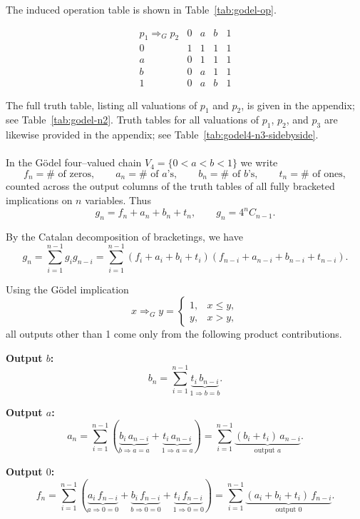 \documentclass[11pt]{article}
\begin{document}
\medskip
The induced operation table is shown in Table~\ref{tab:godel-op}.

\begin{table}[h]
\centering
\[
\begin{array}{c|cccc}
p_1 \Rightarrow_G p_2 & 0 & a & b & 1\\
\hline
0 & 1 & 1 & 1 & 1\\
a & 0 & 1 & 1 & 1\\
b & 0 & a & 1 & 1\\
1 & 0 & a & b & 1
\end{array}
\]
\caption{Gödel implication on \(V_4=\{0<a<b<1\}\).}
\label{tab:godel-op}
\end{table}

The full truth table, listing all valuations of \(p_1\) and \(p_2\), is given in the appendix;
see Table~\ref{tab:godel-n2}. Truth tables for all valuations of \(p_1\), \(p_2\), and \(p_3\)
are likewise provided in the appendix; see Table~\ref{tab:godel4-n3-sidebyside}.
\\\\
In the Gödel four--valued chain \(V_4=\{0<a<b<1\}\) we write
\[
f_n=\#\text{ of zeros},\qquad a_n=\#\text{ of \(a\)'s},\qquad b_n=\#\text{ of \(b\)'s},\qquad
t_n=\#\text{ of ones},
\]
counted across the output columns of the truth tables of all fully bracketed implications
on \(n\) variables. Thus
\[
g_n=f_n+a_n+b_n+t_n,
\qquad g_n=4^n C_{n-1}.
\]

By the Catalan decomposition of bracketings, we have
\[
g_n=\sum_{i=1}^{n-1} g_i g_{n-i}
   =\sum_{i=1}^{n-1}(f_i+a_i+b_i+t_i)(f_{n-i}+a_{n-i}+b_{n-i}+t_{n-i}).
\]

Using the Gödel implication
\[
x\Rightarrow_G y=
\begin{cases}
1,& x\le y,\\
y,& x>y,
\end{cases}
\]
all outputs other than 1 come only from the following product contributions.

\medskip

\noindent\textbf{Output $b$:}
\[
b_n=\sum_{i=1}^{n-1}
\underbrace{t_i\,b_{n-i}}_{\text{$1\Rightarrow b=b$}}.
\]

\noindent\textbf{Output $a$:}
\[
a_n=\sum_{i=1}^{n-1}\left(
\underbrace{b_i\,a_{n-i}}_{\text{$b\Rightarrow a=a$}}
+
\underbrace{t_i\,a_{n-i}}_{\text{$1\Rightarrow a=a$}}
\right)
=\sum_{i=1}^{n-1}\underbrace{(b_i+t_i)\,a_{n-i}}_{\text{output $a$}}.
\]

\noindent\textbf{Output $0$:}
\[
f_n=\sum_{i=1}^{n-1}\left(
\underbrace{a_i\,f_{n-i}}_{\text{$a\Rightarrow 0=0$}}
+
\underbrace{b_i\,f_{n-i}}_{\text{$b\Rightarrow 0=0$}}
+
\underbrace{t_i\,f_{n-i}}_{\text{$1\Rightarrow 0=0$}}
\right)
=\sum_{i=1}^{n-1}\underbrace{(a_i+b_i+t_i)\,f_{n-i}}_{\text{output $0$}}.
\]
\end{document}
